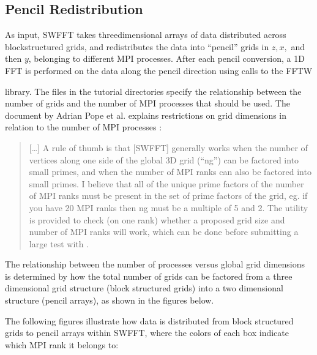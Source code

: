 \documentclass[letterpaper,10pt,english]{sphinxmanual}
\begin{document}
\subsection{Pencil Redistribution}
\label{\detokenize{SWFFT:pencil-redistribution}}
\sphinxAtStartPar
As input, SWFFT takes three\sphinxhyphen{}dimensional arrays of data distributed across block\sphinxhyphen{}structured grids, and redistributes the data into “pencil” grids in \(z, x,\) and then \(y\), belonging to different MPI processes. After each pencil conversion, a 1D FFT is performed on the data along the pencil direction using calls to the FFTW \sphinxstepexplicit %
\begin{footnote}[3]\label{\thesphinxscope.3}%
\sphinxAtStartFootnote
{}
%
\end{footnote} library. The  files in the tutorial directories specify the relationship between the number of grids and the number of MPI processes that should be used. The   document by Adrian Pope et al. explains restrictions on grid dimensions in relation to the number of MPI processes \sphinxfootnotemark[1]  \sphinxfootnotemark[2]:
\begin{quote}

\sphinxAtStartPar
{[}…{]} A rule of thumb is that {[}SWFFT{]} generally works when the number of vertices along
one side of the global 3D grid (“ng”) can be factored into small primes, and
when the number of MPI ranks can also be factored into small primes.
I believe that all of the unique prime factors of the number of MPI ranks
must be present in the set of prime factors of the grid, eg. if you have
20 MPI ranks then ng must be a multiple of 5 and 2. The 
utility is provided to check (on one rank) whether a proposed grid size and
number of MPI ranks will work, which can be done before submitting a large
test with .
\end{quote}

\sphinxAtStartPar
The relationship between the number of processes versus global grid dimensions is determined by how the total number of grids can be factored from a three dimensional grid structure (block structured grids) into a two dimensional structure (pencil arrays), as shown in the figures below.

\sphinxAtStartPar
The following figures illustrate how data is distributed from block structured grids to pencil arrays within SWFFT, where the colors of each box indicate which MPI rank it belongs to:
\end{document}
